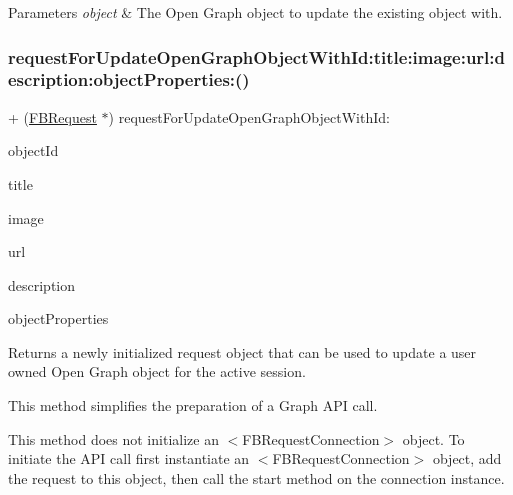 \begin{DoxyParams}{Parameters}
{\em object} & The Open Graph object to update the existing object with. \\
\hline
\end{DoxyParams}
\mbox{\label{interfaceFBRequest_a9accf3aae3b94802e07a0358979bf37d}} 
\subsubsection{\texorpdfstring{request\+For\+Update\+Open\+Graph\+Object\+With\+Id\+:title\+:image\+:url\+:description\+:object\+Properties\+:()}{requestForUpdateOpenGraphObjectWithId:title:image:url:description:objectProperties:()}\hspace{0.1cm}{\footnotesize\ttfamily [1/5]}}
{\footnotesize\ttfamily + (\hyperlink{interfaceFBRequest}{F\+B\+Request} $\ast$) request\+For\+Update\+Open\+Graph\+Object\+With\+Id\+: \begin{DoxyParamCaption}\item[{(id)}]{object\+Id }\item[{title:(N\+S\+String $\ast$)}]{title }\item[{image:(id)}]{image }\item[{url:(id)}]{url }\item[{description:(N\+S\+String $\ast$)}]{description }\item[{objectProperties:(N\+S\+Dictionary $\ast$)}]{object\+Properties }\end{DoxyParamCaption}}

Returns a newly initialized request object that can be used to update a user owned Open Graph object for the active session.

This method simplifies the preparation of a Graph A\+PI call.

This method does not initialize an $<$\+F\+B\+Request\+Connection$>$ object. To initiate the A\+PI call first instantiate an $<$\+F\+B\+Request\+Connection$>$ object, add the request to this object, then call the {\ttfamily start} method on the connection instance.


